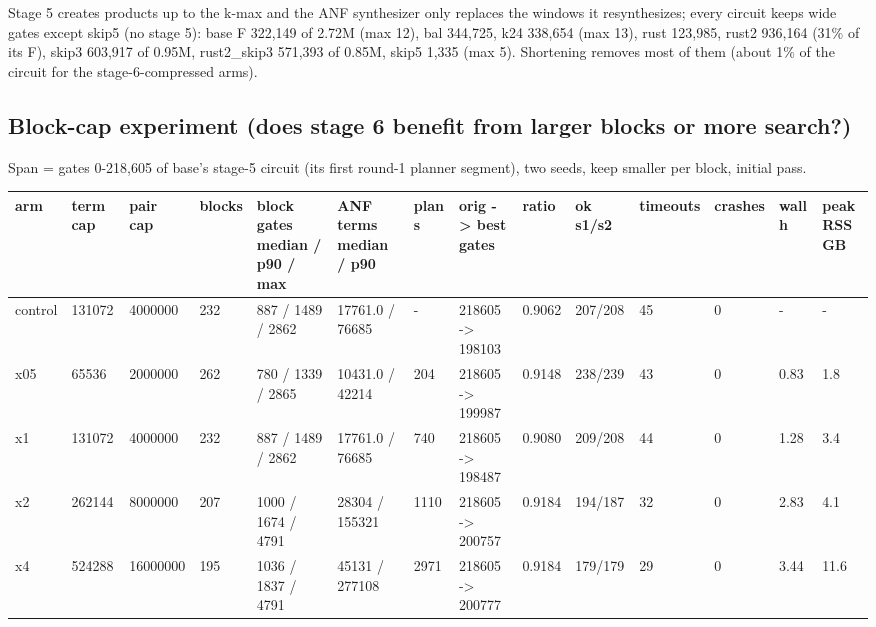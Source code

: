 \documentclass[10pt,a4paper]{article}
\begin{document}
Stage 5 creates products up to the k-max and the ANF synthesizer only replaces the windows it resynthesizes; every circuit keeps wide gates except skip5 (no stage 5): base F 322,149 of 2.72M (max 12), bal 344,725, k24 338,654 (max 13), rust 123,985, rust2 936,164 (31\% of its F), skip3 603,917 of 0.95M, rust2\_skip3 571,393 of 0.85M, skip5 1,335 (max 5). Shortening removes most of them (about 1\% of the circuit for the stage-6-compressed arms).

\subsection{Block-cap experiment (does stage 6 benefit from larger blocks or more search?)}

Span = gates 0-218,605 of base's stage-5 circuit (its first round-1 planner segment), two seeds, keep smaller per block, initial pass.

\begin{landscape}{\tiny\setlength{\tabcolsep}{2pt}\begin{longtable}{|p{1.22cm}|p{1.32cm}|p{1.32cm}|p{1.11cm}|p{2.91cm}|p{2.42cm}|p{1.11cm}|p{2.14cm}|p{1.11cm}|p{1.32cm}|p{1.32cm}|p{1.22cm}|p{1.11cm}|p{1.59cm}|}\hline
\textbf{arm} & \textbf{term cap} & \textbf{pair cap} & \textbf{blocks} & \textbf{block gates median /\allowbreak{} p90 /\allowbreak{} max} & \textbf{ANF terms median /\allowbreak{} p90} & \textbf{plan s} & \textbf{orig -\textgreater{} best gates} & \textbf{ratio} & \textbf{ok s1/\allowbreak{}s2} & \textbf{timeouts} & \textbf{crashes} & \textbf{wall h} & \textbf{peak RSS GB}\\\hline\endhead
control & 131072 & 4000000 & 232 & 887 /\allowbreak{} 1489 /\allowbreak{} 2862 & 17761.0 /\allowbreak{} 76685 & - & 218605 -\textgreater{} 198103 & 0.9062 & 207/\allowbreak{}208 & 45 & 0 & - & -\\\hline
x05 & 65536 & 2000000 & 262 & 780 /\allowbreak{} 1339 /\allowbreak{} 2865 & 10431.0 /\allowbreak{} 42214 & 204 & 218605 -\textgreater{} 199987 & 0.9148 & 238/\allowbreak{}239 & 43 & 0 & 0.83 & 1.8\\\hline
x1 & 131072 & 4000000 & 232 & 887 /\allowbreak{} 1489 /\allowbreak{} 2862 & 17761.0 /\allowbreak{} 76685 & 740 & 218605 -\textgreater{} 198487 & 0.9080 & 209/\allowbreak{}208 & 44 & 0 & 1.28 & 3.4\\\hline
x2 & 262144 & 8000000 & 207 & 1000 /\allowbreak{} 1674 /\allowbreak{} 4791 & 28304 /\allowbreak{} 155321 & 1110 & 218605 -\textgreater{} 200757 & 0.9184 & 194/\allowbreak{}187 & 32 & 0 & 2.83 & 4.1\\\hline
x4 & 524288 & 16000000 & 195 & 1036 /\allowbreak{} 1837 /\allowbreak{} 4791 & 45131 /\allowbreak{} 277108 & 2971 & 218605 -\textgreater{} 200777 & 0.9184 & 179/\allowbreak{}179 & 29 & 0 & 3.44 & 11.6\\\hline
\end{longtable}}\end{landscape}
\end{document}
